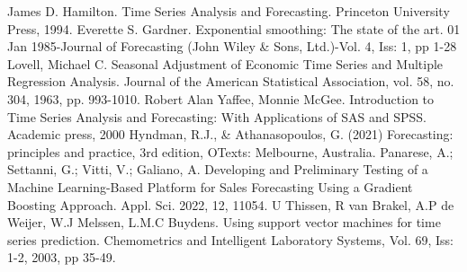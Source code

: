 \documentclass[diploma]{nanolab2015}
\begin{document}
\newpage

\begin{thebibliography}{00}
    James D. Hamilton. Time Series Analysis and Forecasting. Princeton University Press, 1994.
    Everette S. Gardner. Exponential smoothing: The state of the art. 01 Jan 1985-Journal of Forecasting (John Wiley \& Sons, Ltd.)-Vol. 4, Iss: 1, pp 1-28
    Lovell, Michael C. Seasonal Adjustment of Economic Time Series and Multiple Regression Analysis. Journal of the American Statistical Association, vol. 58, no. 304, 1963, pp. 993-1010.
    Robert Alan Yaffee, Monnie McGee. Introduction to Time Series Analysis and Forecasting: With Applications of SAS and SPSS. Academic press, 2000
    Hyndman, R.J., \& Athanasopoulos, G. (2021) Forecasting: principles and practice, 3rd edition, OTexts: Melbourne, Australia.
    Panarese, A.; Settanni, G.; Vitti, V.; Galiano, A. Developing and Preliminary Testing of a Machine Learning-Based Platform for Sales Forecasting Using a Gradient Boosting Approach. Appl. Sci. 2022, 12, 11054.
    U Thissen, R van Brakel, A.P de Weijer, W.J Melssen, L.M.C Buydens. Using support vector machines for time series prediction. Chemometrics and Intelligent Laboratory Systems, Vol. 69, Iss: 1-2, 2003, pp 35-49.
\end{thebibliography}
\end{document}
